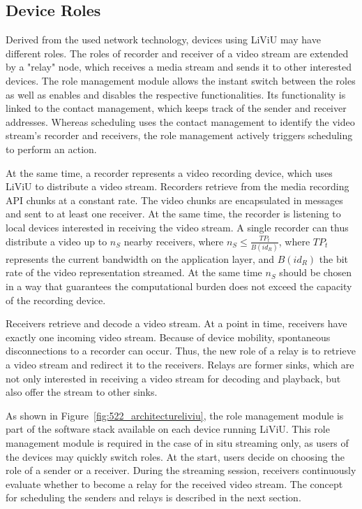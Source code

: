 \subsection{Device Roles}
Derived from the used network technology, devices using \ac{LiViU} may have different roles.
The roles of recorder and receiver of a video stream are extended by a "relay" node, which receives a media stream and sends it to other interested devices.
The role management module allows the instant switch between the roles as well as enables and disables the respective functionalities.
Its functionality is linked to the contact management, which keeps track of the sender and receiver addresses.
Whereas scheduling uses the contact management to identify the video stream's recorder and receivers, the role management actively triggers scheduling to perform an action.

At the same time, a recorder represents a video recording device, which uses \ac{LiViU} to distribute a video stream.
Recorders retrieve from the media recording \ac{API} chunks at a constant rate.
The video chunks are encapsulated in messages and sent to at least one receiver.
At the same time, the recorder is listening to local devices interested in receiving the video stream.
A single recorder can thus distribute a video up to $n_{S}$ nearby receivers, where $n_{S} \leq \frac{TP_t}{B(id_{R})}$, where $TP_t$ represents the current bandwidth on the application layer, and $B(id_{R})$ the bit rate of the video representation streamed.
At the same time $n_{S}$ should be chosen in a way that guarantees the computational burden does not exceed the capacity of the recording device.

Receivers retrieve and decode a video stream. 
At a point in time, receivers have exactly one incoming video stream.
Because of device mobility, spontaneous disconnections to a recorder can occur.
Thus, the new role of a relay is to retrieve a video stream and redirect it to the receivers.
Relays are former sinks, which are not only interested in receiving a video stream for decoding and playback, but also offer the stream to other sinks.

As shown in Figure~\ref{fig:522_architectureliviu}, the role management module is part of the software stack available on each device running \ac{LiViU}.
This role management module is required in the case of in situ streaming only, as users of the devices may quickly switch roles.
At the start, users decide on choosing the role of a sender or a receiver.
During the streaming session, receivers continuously evaluate whether to become a relay for the received video stream.
The concept for scheduling the senders and relays is described in the next section.
